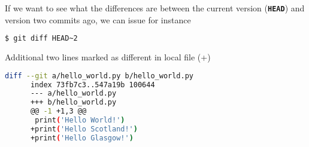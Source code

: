\begin{frame}[fragile]
\emptyframetitle

  If we want to see what the differences are between the current version (\texttt{\textbf{HEAD}}) and version two commits ago, we can issue for instance

  \begin{lstlisting}[language=bash]
    $ git diff HEAD~2
  \end{lstlisting}

  \begin{block}{Additional two lines marked as different in local file (+)}
    \begin{lstlisting}[language=bash]
      diff --git a/hello_world.py b/hello_world.py
      index 73fb7c3..547a19b 100644
      --- a/hello_world.py
      +++ b/hello_world.py
      @@ -1 +1,3 @@
       print('Hello World!')
      +print('Hello Scotland!')
      +print('Hello Glasgow!')
    \end{lstlisting}
  \end{block}
\end{frame}

